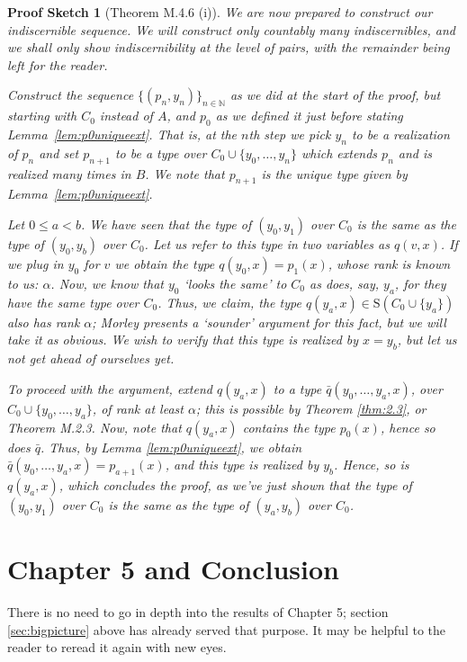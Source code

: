 \documentclass{article}
\theoremstyle{nonumberplain}
\newtheorem{sketch}{Proof Sketch}
\newcommand{\N}{\mathbb{N}}
\newcommand{\Stone}{\mathrm{S}}
\begin{document}
\begin{sketch}[Theorem M.4.6 (i)]
We are now prepared to construct our indiscernible sequence. We will construct only countably many indiscernibles, and we shall only show indiscernibility at the level of pairs, with the remainder being left for the reader.

Construct the sequence $\{(p_n, y_n)\}_{n \in \N}$ as we did at the start of the proof, but starting with $C_0$ instead of $A$, and $p_0$ as we defined it just before stating Lemma~\ref{lem:p0uniqueext}. That is, at the $n$th step we pick $y_n$ to be a realization of $p_n$ and set $p_{n+1}$ to be a type over $C_0 \cup \{y_0, \dots, y_n\}$ which extends $p_n$ and is realized many times in $B$. We note that $p_{n+1}$ is the unique type given by Lemma~\ref{lem:p0uniqueext}.

Let $0 \leq a < b$. We have seen that the type of $(y_0,y_1)$ over $C_0$ is the same as the type of $(y_0, y_b)$ over $C_0$. Let us refer to this type in two variables as $q(v, x)$. If we plug in $y_0$ for $v$ we obtain the type $q(y_0, x) = p_1(x)$, whose rank is known to us: $\alpha$. Now, we know that $y_0$ `looks the same' to $C_0$ as does, say, $y_a$, for they have the same type over $C_0$. Thus, we claim, the type $q(y_a, x) \in \Stone(C_0 \cup \{y_a\})$ also has rank $\alpha$; Morley presents a `sounder' argument for this fact, but we will take it as obvious. We wish to verify that this type is realized by $x = y_b$, but let us not get ahead of ourselves yet.

To proceed with the argument, extend $q(y_a,x)$ to a type $\bar q(y_0, \dots, y_a, x)$, over $C_0 \cup \{y_0, \dots, y_a\}$, of rank at least $\alpha$; this is possible by Theorem \ref{thm:2.3}, or Theorem M.2.3. Now, note that $q(y_a,x)$ contains the type $p_0(x)$, hence so does $\bar q$. Thus, by Lemma \ref{lem:p0uniqueext}, we obtain $\bar q(y_0, \dots, y_a, x) = p_{a+1}(x)$, and this type is realized by $y_b$. Hence, so is $q(y_a,x)$, which concludes the proof, as we've just shown that the type of $(y_0,y_1)$ over $C_0$ is the same as the type of $(y_a,y_b)$ over $C_0$.
\end{sketch}

\section{Chapter 5 and Conclusion}\label{sec:ch5}

There is no need to go in depth into the results of Chapter 5; section \ref{sec:bigpicture} above has already served that purpose. It may be helpful to the reader to reread it again with new eyes.
\end{document}
